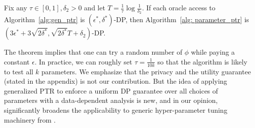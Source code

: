 \begin{theorem}
Fix any $\tau \in [0, 1], \delta_2>0$ and let $T =\frac{1}{\tau} \log \frac{1}{\delta_2}$. If each oracle access to Algorithm~\ref{alg:gen_ptr} is $(\epsilon^*, \delta^*)$-DP, then
Algorithm~\ref{alg: parameter_ptr} is $(3\epsilon^* + 3\sqrt{2\delta^*}, \sqrt{2\delta^*} T +\delta_2 )$-DP.%
\end{theorem}
The theorem implies that one can try a random number of $\phi$ while paying a constant $\epsilon$.
In practice, we can roughly set $\tau = \frac{1}{10k}$ so that the algorithm is likely to test all $k$ parameters. We emphasize that the privacy and the utility guarantee (stated in the appendix) is not our contribution. But the idea of applying generalized PTR to enforce a uniform DP guarantee over all choices of parameters with a data-dependent analysis is new, and in our opinion, significantly broadens the applicability to generic hyper-parameter tuning machinery from \citet{liu2019private}.